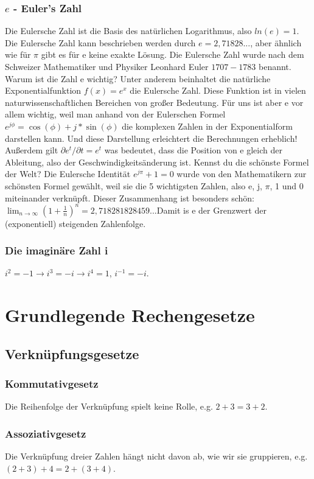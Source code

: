 \documentclass{scrreprt}
\begin{document}
\subsubsection{$e$ - Euler's Zahl}\label{Euler's Zahl}
Die Eulersche Zahl ist die Basis des natürlichen Logarithmus, also $ln(e) = 1$. Die Eulersche Zahl kann beschrieben werden durch $e = 2,71828$..., aber ähnlich wie für $\pi$ gibt es für e keine exakte Lösung. Die Eulersche Zahl wurde nach dem Schweizer Mathematiker und Physiker Leonhard Euler \(1707-1783\) benannt.
Warum ist die Zahl e wichtig?
Unter anderem beinhaltet die natürliche Exponentialfunktion $f(x) = e^x$ die Eulersche Zahl. 
Diese Funktion ist in vielen naturwissenschaftlichen Bereichen von großer Bedeutung. 
Für uns ist aber e vor allem wichtig, weil man anhand von der Eulerschen Formel $e^{j\phi}=\cos(\phi)+j*\sin(\phi)$ die komplexen Zahlen in der Exponentialform darstellen kann. 
Und diese Darstellung erleichtert die Berechnungen erheblich!
Außerdem gilt $\partial e^t/\partial t=e^t$ was bedeutet, dass die Position von e gleich der Ableitung, also der Geschwindigkeitsänderung ist.
Kennst du die schönste Formel der Welt?
Die Eulersche Identität $e^{j\pi} + 1 = 0$ wurde von den Mathematikern zur schönsten Formel gewählt, weil sie die 5 wichtigsten Zahlen, also e, j, $\pi$, 1 und 0 miteinander verknüpft.
Dieser Zusammenhang ist besonders schön: $\lim_{n \to \infty}\left(1+\frac{1}{n} \right)^n=2,718281828459...$Damit is e der Grenzwert der (exponentiell) steigenden Zahlenfolge.  
\subsubsection{Die imaginäre Zahl i}\label{Die imaginäre Zahl}
$i^2=-1 \rightarrow i^3=-i \rightarrow i^4=1$, $i^{-1}=-i$.
\section{Grundlegende Rechengesetze}\label{Grundlegende Rechengesetze}
\subsection{Verknüpfungsgesetze}\label{Verknüpfungsgesetze}
\subsubsection{Kommutativgesetz}\label{Kommutativgesetz}
Die Reihenfolge der Verknüpfung spielt keine Rolle, e.g. $2+3=3+2$. 
\subsubsection{Assoziativgesetz}\label{Assoziativgesetz}
Die Verknüpfung dreier Zahlen hängt nicht davon ab, wie wir sie gruppieren, e.g. $(2 + 3) + 4 = 2 + (3 + 4)$. 
\end{document}
